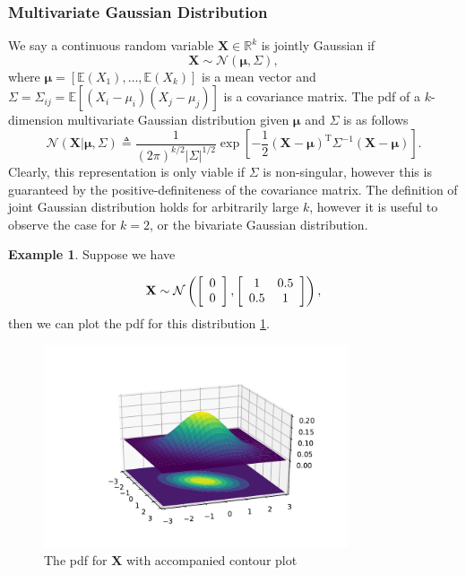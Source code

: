\documentclass[10pt,a4paper]{article}
\numberwithin{equation}{section}
\theoremstyle{plain}
\theoremstyle{definition}
\theoremstyle{own}
\newtheorem{example}{Example}[section]
\begin{document}
\subsubsection{Multivariate Gaussian Distribution}
We say a continuous random variable $\mathbf{X} \in \mathbb{R}^{k}$ is jointly Gaussian if
\[ \mathbf{X} \sim \mathcal{N}(\boldsymbol\mu, \Sigma), \]
where $\boldsymbol\mu = \left[ \mathbb{E}(X_1), \ldots, \mathbb{E}(X_k) \right]$ is a mean vector and $\Sigma = \Sigma_{ij} = \mathbb{E}[(X_i - \mu_i)(X_j - \mu_j)]$ is a covariance matrix. The pdf of a $k$-dimension multivariate Gaussian distribution given $\boldsymbol\mu$ and $\Sigma$ is as follows
\begin{equation}
\mathcal{N}(\mathbf{X} | \boldsymbol\mu, \Sigma) \triangleq \frac{1}{(2 \pi)^{k/2} |\Sigma|^{1/2}} \exp\left[-\frac{1}{2}(\mathbf{X} - \boldsymbol\mu)^{\text{T}}\Sigma^{-1}(\mathbf{X} - \boldsymbol\mu)\right].
\end{equation}
Clearly, this representation is only viable if $\Sigma$ is non-singular, however this is guaranteed by the positive-definiteness of the covariance matrix. The definition of joint Gaussian distribution holds for arbitrarily large $k$, however it is useful to observe the case for $k = 2$, or the bivariate Gaussian distribution.

\begin{example} \label{ex11}
Suppose we have

\begin{equation}
\mathbf{X} \sim \mathcal{N} \left( \left[ \begin{array}{c} 0 \\ 0 \end{array} \right], \left[ \begin{array}{c c} 1 & 0.5 \\ 0.5 & 1 \end{array} \right] \right),
\end{equation}
then we can plot the pdf for this distribution \ref{fig11}.
\begin{figure}[H]
\centering
\includegraphics[width=0.8\textwidth]{bivgaus}
\caption{The pdf for $\mathbf{X}$ with accompanied contour plot}
\label{fig11}
\end{figure}
\end{example}
\end{document}
